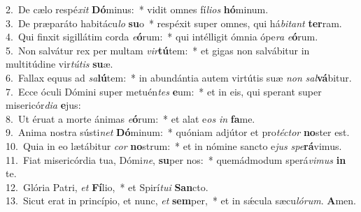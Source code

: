 {2.~}De cælo respé\textit{xit} \textbf{Dó}minus:~* vidit omnes fí\textit{li}\textit{os} \textbf{hó}minum.\\
{3.~}De præparáto habitácu\textit{lo} \textbf{su}o~* respéxit super omnes, qui há\textit{bi}\textit{tant} \textbf{ter}ram.\\
{4.~}Qui finxit sigillátim corda \textit{e}\textbf{ó}rum:~* qui intélligit ómnia ópe\textit{ra} \textit{e}\textbf{ó}rum.\\
{5.~}Non salvátur rex per multam \textit{vir}\textbf{tú}tem:~* et gigas non salvábitur in multitúdine vir\textit{tú}\textit{tis} \textbf{su}æ.\\
{6.~}Fallax equus ad \textit{sa}\textbf{lú}tem:~* in abundántia autem virtútis suæ \textit{non} \textit{sal}\textbf{vá}bitur.\\
{7.~}Ecce óculi Dómini super metuén\textit{tes} \textbf{e}um:~* et in eis, qui sperant super misericór\textit{di}\textit{a} \textbf{e}jus:\\
{8.~}Ut éruat a morte ánimas \textit{e}\textbf{ó}rum:~* et alat e\textit{os} \textit{in} \textbf{fa}me.\\
{9.~}Anima nostra sústi\textit{net} \textbf{Dó}minum:~* quóniam adjútor et pro\textit{té}\textit{ctor} \textbf{no}ster est.\\
{10.~}Quia in eo lætábitur \textit{cor} \textbf{no}strum:~* et in nómine sancto e\textit{jus} \textit{spe}\textbf{rá}vimus.\\
{11.~}Fiat misericórdia tua, Dómi\textit{ne}, \textbf{su}per nos:~* quemádmodum sperá\textit{vi}\textit{mus} \textbf{in} te.\\
{12.~}Glória Patri, \textit{et} \textbf{Fí}lio,~* et Spirí\textit{tu}\textit{i} \textbf{San}cto.\\
{13.~}Sicut erat in princípio, et nunc, \textit{et} \textbf{sem}per,~* et in sǽcula sæcu\textit{ló}\textit{rum}. \textbf{A}men.\\
